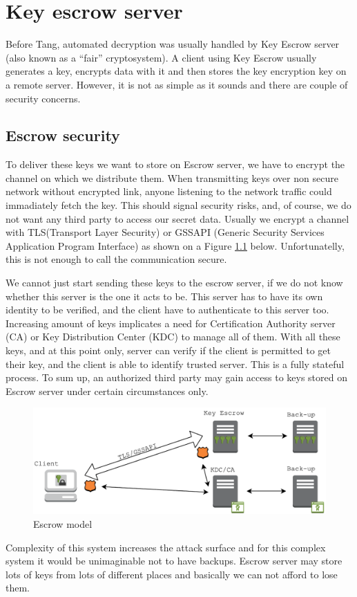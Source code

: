 %

\chapter{Key escrow server}\label{escrow}
Before Tang, automated decryption was usually handled by Key Escrow server (also known as a “fair” cryptosystem).
A client using Key Escrow usually generates a key, encrypts data with it and then stores the key encryption key on a remote server.
However, it is not as simple as it sounds and there are couple of security concerns.

\section{Escrow security}

To deliver these keys we want to store on Escrow server, we have to encrypt the channel on which we distribute them.
When transmitting keys over non secure network without encrypted link, anyone listening to the network traffic could immadiately fetch the key.
This should signal security risks, and, of course, we do not want any third party to access our secret data.
Usually we encrypt a channel with TLS(Transport Layer Security) or GSSAPI (Generic Security Services Application Program Interface) as shown on a Figure \ref{fig:escrowmodel} below.
Unfortunatelly, this is not enough to call the communication secure.

We cannot just start sending these keys to the escrow server, if we do not know whether this server is the one it acts to be.
This server has to have its own identity to be verified, and the client have to authenticate to this server too.
Increasing amount of keys implicates a need for Certification Authority server (CA) or Key Distribution Center (KDC) to manage all of them.
With all these keys, and at this point only, server can verify if the client is permitted to get their key, and the client is able to identify trusted server.
This is a fully stateful process.
To sum up, an authorized third party may gain access to keys stored on Escrow server under certain circumstances only.

\begin{figure}[h]
    \centering
    \includegraphics[scale=0.7]{figures/EscrowModel.pdf}
    \caption{Escrow model}
    \label{fig:escrowmodel}
\end{figure}

Complexity of this system increases the attack surface and for this complex system it would be unimaginable not to have backups.
Escrow server may store lots of keys from lots of different places and basically we can not afford to lose them.
%
